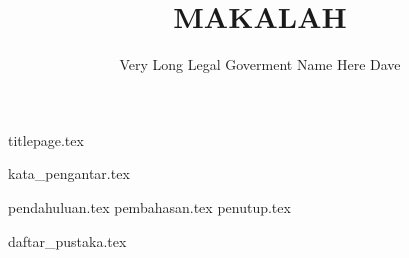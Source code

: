 \documentclass[a4paper,12pt]{extreport}
\title{\MakeUppercase{Makalah \matkul{}\\ \judulmakalah}}
\author{Very Long Legal Goverment Name Here Dave}
\begin{document}
{titlepage.tex}

{kata_pengantar.tex}

\tableofcontents
{}
\listoftables
{}

{pendahuluan.tex}
{pembahasan.tex}
{penutup.tex}

{daftar_pustaka.tex}

\end{document}
